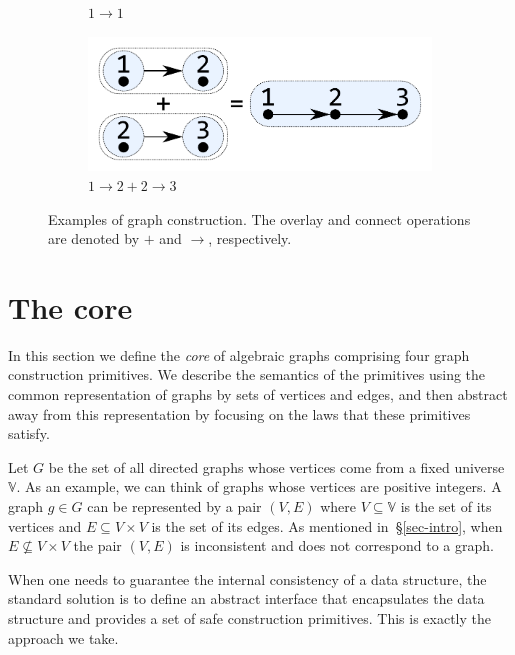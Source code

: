 \begin{figure}
\begin{subfigure}[b]{0.15\linewidth}
\vspace{2.4mm}
\caption{$1 \rightarrow 1$}
\end{subfigure}
\hspace{12mm}
\begin{subfigure}[b]{0.2\linewidth}
\centerline{\includegraphics[scale=0.27]{fig/ex-e-new.pdf}}
\vspace{-1mm}
\caption{$1 \rightarrow 2 + 2 \rightarrow 3$}
\end{subfigure}
\caption{Examples of graph construction. The overlay and connect operations are denoted
by $+$ and $\rightarrow$, respectively.\label{fig-construction}}
\end{figure}

\section{The core}\label{sec-core}
In this section we define the \emph{core} of algebraic graphs comprising
four graph construction primitives. We describe the semantics of the primitives
using the common representation of graphs by sets of vertices and edges, and
then abstract away from this representation by focusing on the laws that these
primitives satisfy.

Let $G$ be the set of all directed graphs whose vertices come from a fixed
universe $\mathbb{V}$. As an example, we can think of graphs whose vertices are
positive integers. A graph $g \in G$ can be represented by a pair $(V, E)$ where
$V\subseteq \mathbb{V}$ is the set of its vertices and $E \subseteq V \times V$ is
the set of its edges. As mentioned in~\S\ref{sec-intro}, when $E \nsubseteq V \times V$
the pair $(V, E)$ is inconsistent and does not correspond to a graph.

When one needs to guarantee the internal consistency of a data structure, the standard
solution is to define an abstract interface that encapsulates the data structure and
provides a set of safe construction primitives. This is exactly the approach we take.

